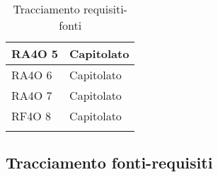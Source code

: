 \begin{center}
\begin{longtable}{ | p{5cm} | p{5cm} |}
        RA4O 5 &  Capitolato \newline  \\ \hline      
        RA4O 6 &  Capitolato \newline  \\ \hline      
        RA4O 7 &  Capitolato \newline  \\ \hline      
        RF4O 8 &  Capitolato \newline  \\ \hline  
      \caption{Tracciamento requisiti-fonti}    
      \end{longtable}
      \egroup
      \end{center}  
\clearpage

\subsection{Tracciamento fonti-requisiti}
